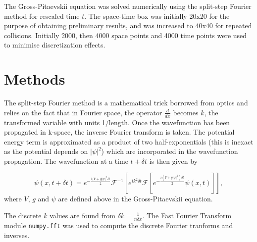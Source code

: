 \documentclass[10pt, twocolumn]{revtex4}    %
\begin{document}
The Gross-Pitaevskii equation was solved numerically using the split-step Fourier method for rescaled time $t$. The space-time box was initially 20x20 for the purpose of obtaining preliminary results, and was increased to 40x40 for repeated collisions. Initially 2000, then 4000 space points and 4000 time points were used to minimise discretization effects. %


\section{Methods} \label{Methods}

The split-step Fourier method is a mathematical trick borrowed from optics and relies on the fact that in Fourier space, the operator $\frac{d}{dx}$ becomes $k$, the transformed variable with units 1/length. Once the wavefunction has been propagated in k-space, the inverse Fourier transform is taken. The potential energy term is approximated as a product of two half-exponentials (this is inexact as the potential depends on $|\psi|^2$) which are incorporated in the wavefunction propagation. The wavefunction at a time $t+\delta t$ is then given by

\begin{equation} \label{fft}
\psi(x,t+\delta t) = e^{-\frac{i(V+g|\psi|^2 \delta t}{2}} \mathcal{F}^{-1}[e^{ik^2 \delta t} \mathcal{F} [e^{- \frac{i(V+g|\psi|^2) \delta t}{2}} \psi(x,t) ] ],
\end{equation}
where $V$, $g$ and $\psi$ are defined above in the Gross-Pitaevskii equation. 

The discrete $k$ values are found from $\delta k = \frac{1}{n \delta x}$. The Fast Fourier Transform module \texttt{numpy.fft} was used to compute the discrete Fourier tranforms and inverses. 
\end{document}
